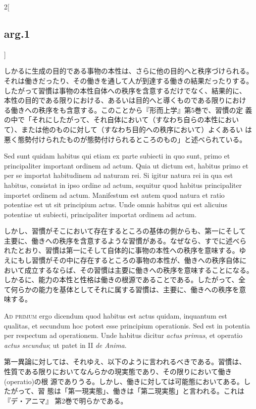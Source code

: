 \documentclass[paper=a4paper,fontsize=10pt,jafontsize=9pt,titlepage]{jlreq}
\begin{document}
\begin{paracol}{2}[\subsection{arg.1}]
\switchcolumn

しかるに生成の目的である事物の本性は、さらに他の目的へと秩序づけられる。
それは働きだったり、その働きを通して人が到達する働きの結果だったりする。
したがって習慣は事物の本性自体への秩序を含意するだけでなく、結果的に、
本性の目的である限りにおける、あるいは目的へと導くものである限りにおけ
る働きへの秩序をも含意する。このことから『形而上学』第5巻で、習慣の定
義の中で「それにしたがって、それ自体において（すなわち自らの本性におい
て）、または他のものに対して（すなわち目的への秩序において）よくあるい
は悪く態勢付けられたものが態勢付けられるところのもの」と述べられている。

\switchcolumn*

Sed sunt quidam habitus qui
etiam ex parte subiecti in quo sunt, primo et principaliter important
ordinem ad actum. Quia ut dictum est, habitus primo et per se importat
habitudinem ad naturam rei. Si igitur natura rei in qua est habitus,
consistat in ipso ordine ad actum, sequitur quod habitus principaliter
importet ordinem ad actum. Manifestum est autem quod natura et ratio
potentiae est ut sit principium actus. Unde omnis habitus qui est
alicuius potentiae ut subiecti, principaliter importat ordinem ad
actum.

\switchcolumn

しかし、習慣がそこにおいて存在するところの基体の側からも、第一にそして
主要に、働きへの秩序を含意するような習慣がある。なぜなら、すでに述べら
れたとおり、習慣は第一にそして自体的に事物の本性への秩序を意味する。ゆ
えにもし習慣がその中に存在するところの事物の本性が、働きへの秩序自体に
おいて成立するならば、その習慣は主要に働きへの秩序を意味することになる。
しかるに、能力の本性と性格は働きの根源であることである。したがって、全
て何らかの能力を基体としてそれに属する習慣は、主要に、働きへの秩序を意
味する。

\switchcolumn*[\subsection{ad.1}]

{\scshape Ad primum} ergo dicendum quod habitus est actus quidam, inquantum est
qualitas, et secundum hoc potest esse principium operationis. Sed est
in potentia per respectum ad operationem. Unde habitus dicitur {\itshape actus
primus}, et operatio {\itshape actus secundus}; ut patet in II {\itshape de Anima}.

\switchcolumn

第一異論に対しては、それゆえ、以下のように言われるべきである。習慣は、
性質である限りにおいてなんらかの現実態であり、その限りにおいて働き(operatio)の根
源でありうる。しかし、働きに対しては可能態においてある。したがって、習
態は「第一現実態」、働きは「第二現実態」と言われる。これは『デ・アニマ』
第2巻で明らかである。


\end{paracol}
\end{document}
